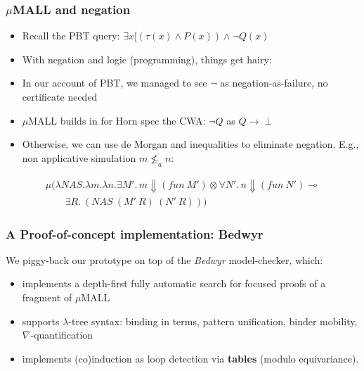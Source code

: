 \documentclass{beamer}
\newcommand{\red}[1]{{\color{red} #1}}
\begin{document}
\begin{frame}
  \frametitle{$\mu$MALL and negation}
  \begin{itemize}
  \item Recall the PBT query: $\exists x [(\tau(x)\land P(x)) \land \neg Q(x)$
  \item With \red{negation} and logic (programming), things get hairy:
  \item In our account of PBT, we managed to see $\neg$ as negation-as-failure, no certificate needed %
  \pause
  \item $\mu$MALL builds in  for Horn spec the \red{CWA}:  $\neg Q$ as $Q\rightarrow\perp$
  \item Otherwise, we can use de Morgan and inequalities to \red{eliminate} negation. E.g., non applicative simulation $m \not\leq_a n$:
  \end{itemize}
  \begin{small}
   $$
\begin{array}{l}
 \mu(\lambda NAS.\lambda m.\lambda n.\exists M'.\,  m\Downarrow (fun\ M')
  \otimes
                         \forall N'.\, n\Downarrow (fun\ N') \multimap\mbox{}\\
  \qquad\exists R.\ ({NAS\ } (M' \ R) \  (N'\ R)))
\end{array}
$$
\end{small}
\end{frame}

\begin{frame}[fragile]
  \frametitle{A Proof-of-concept implementation: \textbf{Bedwyr}}
  We piggy-back our prototype on top of the \emph{Bedwyr} model-checker, which:
  \begin{itemize}
  \item implements a depth-first fully automatic search for focused proofs of a fragment of $\mu$MALL
  \item supports $\lambda$-tree syntax: binding in terms, pattern unification, binder mobility, $\nabla$-quantification
  \item implements (co)induction as loop detection via \textbf{tables} (modulo equivariance).
  \end{itemize}
\end{frame}
\end{document}
